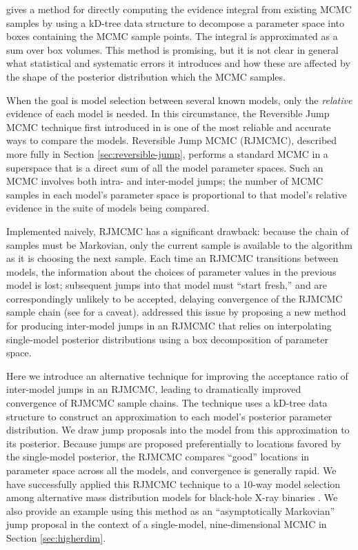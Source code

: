 \documentclass{iopart}
\begin{document}
\cite{Weinberg2009} gives a method for directly computing
the evidence integral from existing MCMC samples by using a kD-tree
data structure to decompose a parameter space into boxes containing
the MCMC sample points.  The integral is approximated as a sum over
box volumes.  This method is promising, but it is not clear in general
what statistical and systematic errors it introduces and how these are
affected by the shape of the posterior distribution which the
MCMC samples.

When the goal is model selection between several known models, only
the \emph{relative} evidence of each model is needed.  In this
circumstance, the Reversible Jump MCMC technique first introduced in
\cite{Green1995} is one of the most reliable and accurate ways to
compare the models.  Reversible Jump MCMC (RJMCMC), described more
fully in Section \ref{sec:reversible-jump}, performs a standard MCMC
in a superspace that is a direct sum of all the model parameter
spaces.  Such an MCMC involves both intra- and inter-model jumps; the
number of MCMC samples in each model's parameter space is proportional
to that model's relative evidence in the suite of models being
compared.

Implemented naively, RJMCMC has a significant drawback: because the
chain of samples must be Markovian, only the current sample is
available to the algorithm as it is choosing the next sample.  Each
time an RJMCMC transitions between models, the information about the
choices of parameter values in the previous model is lost; subsequent
jumps into that model must ``start fresh,'' and are correspondingly
unlikely to be accepted, delaying convergence of the RJMCMC sample
chain (see  for a caveat).  
\cite{Littenberg2009} addressed this issue by proposing a new
method for producing inter-model jumps in an RJMCMC that relies on
interpolating single-model posterior distributions using a box
decomposition of parameter space.

Here we introduce an alternative technique for improving the
acceptance ratio of inter-model jumps in an RJMCMC, leading to
dramatically improved convergence of RJMCMC sample chains.  The
technique uses a kD-tree data structure to construct an approximation
to each model's posterior parameter distribution.  We draw jump
proposals into the model from this approximation to its posterior.
Because jumps are proposed preferentially to locations favored by the
single-model posterior, the RJMCMC compares ``good'' locations in
parameter space across all the models, and convergence is generally
rapid.  We have successfully applied this RJMCMC technique to a 10-way
model selection among alternative mass distribution models for
black-hole X-ray binaries \cite{Farr2010}.  We also provide an example
using this method as an ``asymptotically Markovian''
\cite{terBraak2008} jump proposal in the context of a single-model,
nine-dimensional MCMC in Section \ref{sec:higherdim}.
\end{document}
